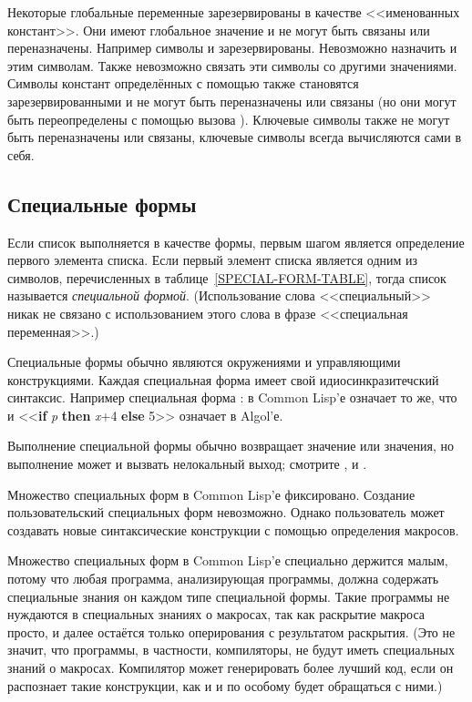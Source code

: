 Некоторые глобальные переменные зарезервированы в качестве <<именованных
констант>>.
Они имеют глобальное значение и не могут быть связаны или переназначены.
Например символы {\true} и {\false} зарезервированы.
Невозможно назначить и этим символам. Также невозможно связать эти символы со
другими значениями. Символы констант определённых с помощью 
также становятся зарезервированными и не могут быть переназначены или связаны
(но они могут быть переопределены с помощью вызова ). Ключевые
символы также не могут быть переназначены или связаны, ключевые символы всегда
вычисляются сами в себя.

\subsection{Специальные формы}

Если список выполняется в качестве формы, первым шагом является определение
первого элемента списка. Если первый элемент списка является одним из символов,
перечисленных в таблице~\ref{SPECIAL-FORM-TABLE}, тогда список называется
\emph{специальной формой}. (Использование слова <<специальный>> никак не
связано с использованием этого слова в фразе <<специальная переменная>>.)

Специальные формы обычно являются окружениями и управляющими конструкциями.
Каждая специальная форма имеет свой идиосинкразитечский синтаксис. Например
специальная форма :
 в Common Lisp'е означает то же, что и
<<\textbf{if} \emph{p} \textbf{then} \emph{x}+4 \textbf{else} 5>> означает в
Algol'е.

Выполнение специальной формы обычно возвращает значение или значения, но
выполнение может и вызвать нелокальный выход; смотрите ,
 и .

Множество специальных форм в Common Lisp'е фиксировано. Создание
пользовательский специальных форм невозможно. Однако пользователь может создавать новые
синтаксические конструкции с помощью определения макросов.

Множество специальных форм в Common Lisp'е специально держится малым, потому что
любая программа, анализирующая программы, должна содержать специальные знания он
каждом типе специальной формы. Такие программы не нуждаются в специальных
знаниях о макросах, так как раскрытие макроса просто, и далее остаётся только
оперирования с результатом раскрытия. (Это не значит, что программы, в
частности, компиляторы, не будут иметь специальных знаний о макросах. Компилятор
может генерировать более лучший код, если он распознает такие конструкции, как
 и  и по особому будет обращаться с ними.)

